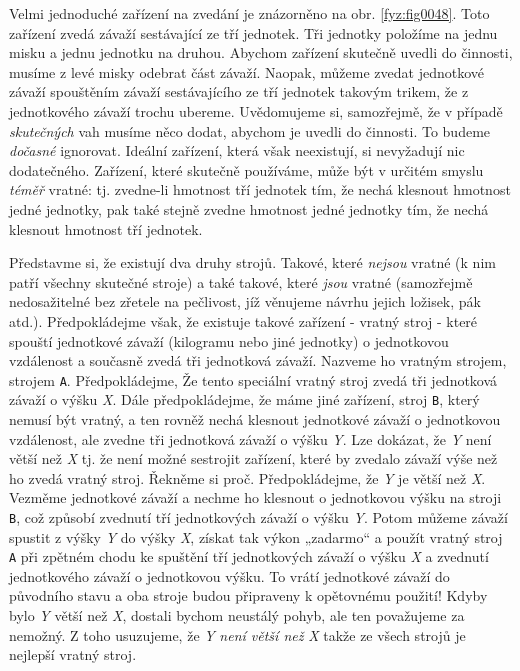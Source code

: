     Velmi jednoduché zařízení na zvedání je znázorněno na obr. \ref{fyz:fig0048}. Toto zařízení 
    zvedá závaží sestávající ze tří jednotek. Tři jednotky položíme na jednu misku a jednu jednotku 
    na druhou. Abychom zařízení skutečně uvedli do činnosti, musíme z levé misky odebrat část 
    závaží. Naopak, můžeme zvedat jednotkové závaží spouštěním závaží sestávajícího ze tří jednotek 
    takovým trikem, že z jednotkového závaží trochu ubereme. Uvědomujeme si, samozřejmě, že v 
    případě \emph{skutečných} vah musíme něco dodat, abychom je uvedli do činnosti. To budeme 
    \emph{dočasné} ignorovat. Ideální zařízení, která však neexistují, si nevyžadují nic 
    dodatečného. Zařízení, které skutečně používáme, může být v určitém smyslu \emph{téměř} vratné: 
    tj. zvedne-li hmotnost tří jednotek tím, že nechá klesnout hmotnost jedné jednotky, pak také 
    stejně zvedne hmotnost jedné jednotky tím, že nechá klesnout hmotnost tří jednotek.
    
    Představme si, že existují dva druhy strojů. Takové, které \emph{nejsou} vratné (k nim patří 
    všechny skutečné stroje) a také takové, které \emph{jsou} vratné (samozřejmě nedosažitelné bez 
    zřetele na pečlivost, jíž věnujeme návrhu jejich ložisek, pák atd.). Předpokládejme však, že 
    existuje takové zařízení - vratný stroj - které spouští jednotkové závaží (kilogramu nebo jiné 
    jednotky) o jednotkovou vzdálenost a současně zvedá tři jednotková závaží. Nazveme ho vratným 
    strojem, strojem \texttt{A}. Předpokládejme, Že tento speciální vratný stroj zvedá tři 
    jednotková závaží o výšku \emph{X}. Dále předpokládejme, že máme jiné zařízení, stroj 
    \texttt{B}, který nemusí být vratný, a ten rovněž nechá klesnout jednotkové závaží o 
    jednotkovou vzdálenost, ale zvedne tři jednotková závaží o výšku \emph{Y}. Lze dokázat, že 
    \emph{Y} není větší než \emph{X} tj. že není možné sestrojit zařízení, které by zvedalo závaží 
    výše než ho zvedá vratný stroj. Řekněme si proč. Předpokládejme, že \emph{Y} je větší než 
    \emph{X}. Vezměme jednotkové závaží a nechme ho klesnout o jednotkovou výšku na stroji 
    \texttt{B}, což způsobí zvednutí tří jednotkových závaží o výšku \emph{Y}. Potom můžeme závaží 
    spustit z výšky \emph{Y} do výšky \emph{X}, získat tak výkon „zadarmo“ a použít vratný stroj 
    \texttt{A} při zpětném chodu ke spuštění tří jednotkových závaží o výšku \emph{X} a zvednutí 
    jednotkového závaží o jednotkovou výšku. To vrátí jednotkové závaží do původního stavu a oba 
    stroje budou připraveny k opětovnému použití! Kdyby bylo \emph{Y} větší než \emph{X}, dostali 
    bychom neustálý pohyb, ale ten považujeme za nemožný. Z toho usuzujeme, že \emph{Y} \emph{není 
    větší než} \emph{X} takže ze všech strojů je nejlepší vratný stroj.
    

